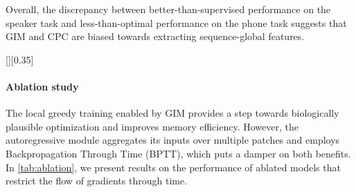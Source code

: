 \documentclass{article}
\begin{document}
Overall, the discrepancy between better-than-supervised performance on the speaker task and less-than-optimal performance on the phone task suggests that GIM and CPC are biased towards extracting sequence-global features.









[][0.35\textwidth]
\begin{figure}
\begin{floatrow}
\hfill
{}
\end{floatrow}
\end{figure}



\paragraph{Ablation study}
The local greedy training enabled by GIM provides a step towards biologically plausible optimization and improves memory efficiency. However, the autoregressive module  aggregates  its inputs over multiple patches and employs Backpropagation Through Time (BPTT), which puts a damper on both benefits. In \cref{tab:ablation}, we present results on the performance of ablated models that restrict the flow of gradients through time. 
\end{document}
